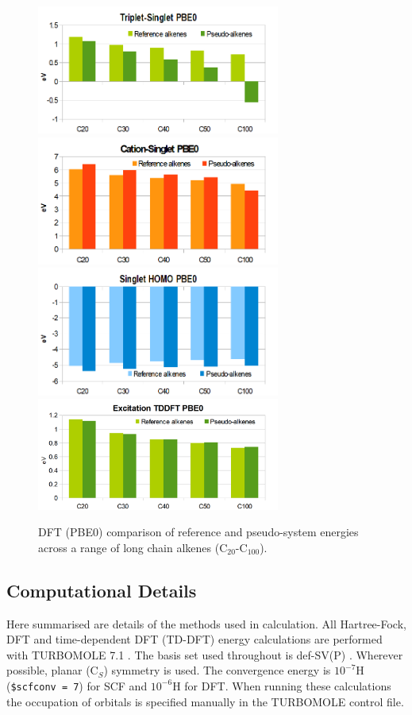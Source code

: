 \documentclass[journal=jctcce,manuscript=article]{achemso}
\begin{document}
\begin{figure}[h]
\includegraphics[width=8cm]{pbe0_excitation_long}
\includegraphics[width=8cm]{pbe0_ionisation_long}
\includegraphics[width=8cm]{pbe0_homo_long}
\includegraphics[width=8cm]{tddft_excitation_long}
\caption{DFT (PBE0) comparison of reference and pseudo-system energies across a range of long chain alkenes (C\(_{20}\)-C\(_{100}\)).}
\label{fig:rings_graphs}
\end{figure}

\subsection{Computational Details}

Here summarised are details of the methods used in calculation. All Hartree-Fock, DFT and time-dependent DFT (TD-DFT) energy calculations are performed with TURBOMOLE 7.1 \cite{TURBOMOLE}. The basis set used throughout is def-SV(P) \cite{defsvp}. Wherever possible, planar (C\(_{S}\)) symmetry is used. The convergence energy is \(10^{-7}\)H (\texttt{\$scfconv = 7}) for SCF and \(10^{-6}\)H for DFT. When running these calculations the occupation of orbitals is specified manually in the TURBOMOLE control file.
\end{document}
